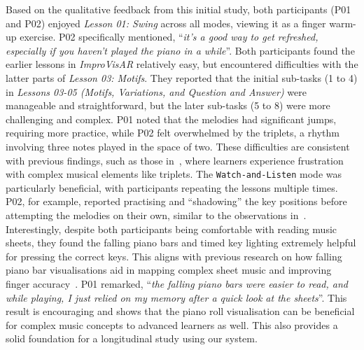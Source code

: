 \documentclass{vgtc}                          %
\begin{document}
Based on the qualitative feedback from this initial study, both participants (P01 and P02) enjoyed \textit{Lesson 01: Swing} across all modes, viewing it as a finger warm-up exercise. P02 specifically mentioned, ``\textit{it's a good way to get refreshed, especially if you haven't played the piano in a while}''. Both participants found the earlier lessons in \textit{ImproVisAR} relatively easy, but encountered difficulties with the latter parts of \textit{Lesson 03: Motifs}. They reported that the initial sub-tasks (1 to 4) in \textit{Lessons 03-05 (Motifs, Variations, and Question and Answer)} were manageable and straightforward, but the later sub-tasks (5 to 8) were more challenging and complex. P01 noted that the melodies had significant jumps, requiring more practice, while P02 felt overwhelmed by the triplets, a rhythm involving three notes played in the space of two. These difficulties are consistent with previous findings, such as those in~\cite{giomi2004not}, where learners experience frustration with complex musical elements like triplets. The \texttt{Watch-and-Listen} mode was particularly beneficial, with participants repeating the lessons multiple times. P02, for example, reported practising and ``shadowing'' the key positions before attempting the melodies on their own, similar to the observations in~\cite{sloboda1992transitions}. Interestingly, despite both participants being comfortable with reading music sheets, they found the falling piano bars and timed key lighting extremely helpful for pressing the correct keys. This aligns with previous research on how falling piano bar visualisations aid in mapping complex sheet music and improving finger accuracy~\cite{takegawa2012piano, fernandez2016piano, rogers2014piano}. P01 remarked, ``\textit{the falling piano bars were easier to read, and while playing, I just relied on my memory after a quick look at the sheets}''. This result is encouraging and shows that the piano roll visualisation can be beneficial for complex music concepts to advanced learners as well. This also provides a solid foundation for a longitudinal study using our system. 
\end{document}
